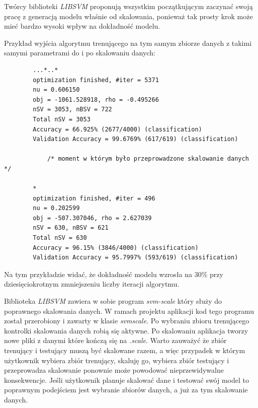 \documentclass[paper=a4, fontsize=11pt]{scrartcl} %
\numberwithin{equation}{section} %
\numberwithin{figure}{section} %
\begin{document}
    \par Twórcy biblioteki \textit{LIBSVM} proponują wszystkim początkującym zaczynać swoją
    pracę z generacją modelu właśnie od skalowania, ponieważ tak prosty krok może mieć bardzo
    wysoki wpływ na dokładność modelu. \\

    \par Przykład wyjścia algorytmu trenującego na tym samym zbiorze danych z takimi samymi
    parametrami do i po skalowaniu danych:
    
    \begin{verbatim}
        ...*..*
        optimization finished, #iter = 5371
        nu = 0.606150
        obj = -1061.528918, rho = -0.495266
        nSV = 3053, nBSV = 722
        Total nSV = 3053
        Accuracy = 66.925% (2677/4000) (classification)
        Validation Accuracy = 99.6769% (617/619) (classification)

            /* moment w którym było przeprowadzone skalowanie danych */

        *
        optimization finished, #iter = 496
        nu = 0.202599
        obj = -507.307046, rho = 2.627039
        nSV = 630, nBSV = 621
        Total nSV = 630
        Accuracy = 96.15% (3846/4000) (classification)
        Validation Accuracy = 95.7997% (593/619) (classification)
    \end{verbatim}
    \par Na tym przykładzie widać, że dokładność modelu wzrosła na 30\% przy dziesięciokrotnym
    zmniejszeniu liczby iteracji algorytmu.\\

    \par Biblioteka \textit{LIBSVM} zawiera w sobie program \textit{svm-scale} który służy do
    poprawnego skalowania danych. W ramach projektu aplikacji kod tego programu został
    przerobiony i zawarty w klasie \textit{svmscale}. Po wybraniu zbioru trenującego kontrolki
    skalowania danych robią się aktywne. Po skalowaniu aplikacja tworzy nowe pliki z danymi
    które kończą się na \textit{.scale}. Warto zauważyć że zbiór trenujący i testujący muszą
    być skalowane razem, a więc przypadek w którym użytkownik wybiera zbiór trenujący, skaluję
    go, wybiera zbiór testujący i przeprowadza skalowanie ponownie może powodować
    nieprzewidywalne konsekwencje. Jeśli użytkownik planuje skalować dane i testować swój model
    to poprawnym podejściem jest wybranie zbiorów danych, a już za tym skalowanie danych.
\end{document}
